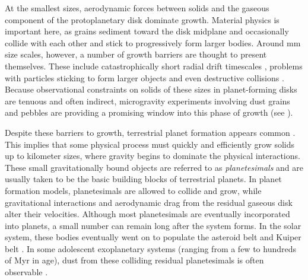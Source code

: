 At the smallest sizes, aerodynamic forces between solids and the gaseous component of the protoplanetary disk dominate growth. Material physics is important here, as grains sediment toward the disk midplane and occasionally collide with each other and stick \cite{okuzumi12, windmark12, garaud13, katoka13} to progressively form larger bodies.  Around mm size scales, however, a number of growth barriers are thought to present themselves. These include catastrophically short radial drift timescales \cite{adachi76, weidenschilling77}, problems with particles sticking to form larger objects and even destructive collisions \cite{windmark12}. Because observational constraints on solids of these sizes in planet-forming disks are tenuous and often indirect, microgravity experiments involving dust grains and pebbles are providing a promising window into this phase of growth (see \cite{wurm21}).

Despite these barriers to growth, terrestrial planet formation appears common \cite{bonfils13, dressing15, gaidos16}. This implies that some physical process must quickly and efficiently grow solids up to kilometer sizes, where gravity begins to dominate the physical interactions. These small gravitationally bound objects are referred to as \textit{planetesimals} and are usually taken to be the basic building blocks of terrestrial planets. In planet formation models, planetesimals are allowed to collide and grow, while gravitational interactions and aerodynamic drag from the residual gaseous disk alter their velocities. Although most planetesimals are eventually incorporated into planets, a small number can remain long after the system forms. In the solar system, these bodies eventually went on to populate the asteroid belt and Kuiper belt \cite{duncan89, bottke05, levison08, morbidelli09}. In some adolescent exoplanetary systems (ranging from a few \cite{espaillat17} to hundreds \cite{mamajek12} of Myr in age), dust from these colliding residual planetesimals is often observable \cite{wyatt08, gaspar20}.

